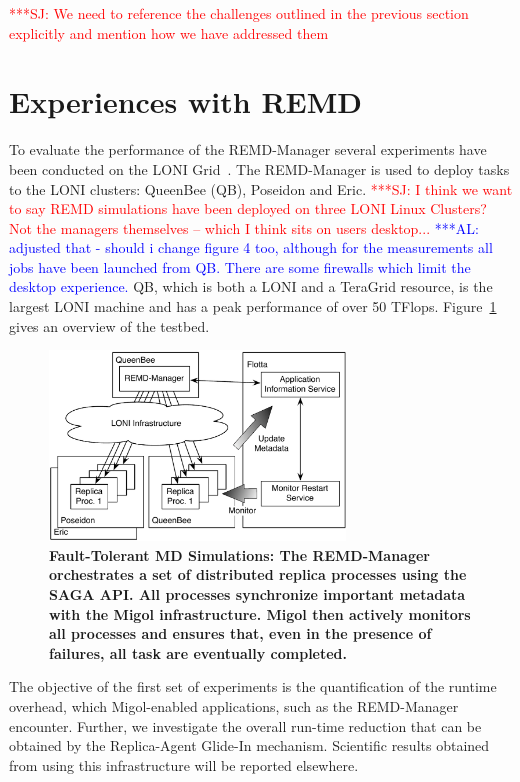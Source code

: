 \documentclass{rspublic}
\newcommand{\alnote}[1]{ {\textcolor{blue} { ***AL: #1 }}}
\newcommand{\jhanote}[1]{ {\textcolor{red} { ***SJ: #1 }}}
\newcommand{\alnote}[1]{}
\newcommand{\jhanote}[1]{}
\newcommand{\glidein}[1]{Glide-In }
\newcommand{\replicaagent}[1]{Replica-Agent }
\begin{document}

\jhanote{We need to reference the challenges outlined in the previous
  section explicitly and mention how we have addressed them}

\section{Experiences with REMD}
\label{sec:exp}       
        
To evaluate the performance of the REMD-Manager several
experiments have been conducted on the LONI
Grid~\citep{loni}. The REMD-Manager is used to deploy tasks to
the LONI clusters: QueenBee (QB), Poseidon and Eric.  \jhanote{I think
  we want to say REMD simulations have been deployed on three LONI
  Linux Clusters? Not the managers themselves -- which I think sits on
  users desktop...}  \alnote{adjusted that - should i change figure 4
  too, although for the measurements all jobs have been launched from
  QB. There are some firewalls which limit the desktop experience.}
QB, which is both a LONI and a TeraGrid resource, is the largest LONI
machine and has a peak performance of over 50 TFlops.
Figure~\ref{fig:saga-taskfarming} gives an overview of the testbed.

\begin{figure}[t]
    \centering
        \includegraphics[width=0.7\textwidth]{saga-taskfarming}
        \caption{\footnotesize \bf Fault-Tolerant MD Simulations: The
          REMD-Manager orchestrates a set of distributed replica
          processes using the SAGA API. All processes synchronize
          important metadata with the Migol infrastructure. Migol then
          actively monitors all processes and ensures that, even in
          the presence of failures, all task are eventually
          completed.}
    \label{fig:saga-taskfarming}
\end{figure} 
The objective of the first set of experiments is the
quantification of the runtime overhead, which Migol-enabled
applications, such as the REMD-Manager encounter.  Further, we investigate the 
overall run-time reduction that can be obtained by the \replicaagent\ \glidein\
mechanism. Scientific results obtained from using this infrastructure will be reported elsewhere.
    
\end{document}
